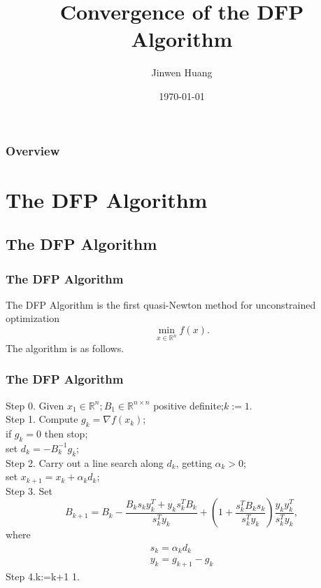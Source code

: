 \documentclass{beamer}
\title[Short title]{Convergence of the DFP Algorithm} %
\author{Jinwen Huang} %
\institute[sysu] %
{
Sun Yat-sen University \\ %
\medskip
\textit{huangjw267@mail2.sysu.edu.cn} %
}
\date{\today} %
\begin{document}
\begin{frame}
\titlepage %
\end{frame}

\begin{frame}
\frametitle{Overview} %
\tableofcontents %
\end{frame}


\section{The DFP Algorithm} 
\subsection{The DFP Algorithm}
\begin{frame}
\frametitle{The DFP Algorithm}
    The DFP Algorithm is the first quasi-Newton method for unconstrained optimization \[\min _{x \in \mathbb{R}^{n}} f(x) . \tag{1.1}\]
    The algorithm is as follows.
\end{frame}

\begin{frame}
\frametitle{The DFP Algorithm}
Step 0. Given $x_1 \in \mathbb{R}^n ; B_1 \in \mathbb{R}^{n \times n}$ positive definite;$k:=1.$\\
Step 1. Compute $g_k=\nabla f\left(x_k\right)$;\\
if $g_k=0$ then stop;\\
set $d_k=-B_k^{-1} g_k$;\\
Step 2. Carry out a line search along $d_k$, getting $\alpha_k>0$;\\
set $x_{k+1}=x_k+\alpha_k d_k$;\\
Step 3. Set\begin{equation*}
    B_{k+1}=B_k-\frac{B_k s_k y_k^T+y_k s_k^T B_k}{s_k^T y_k}+\left(1+\frac{s_k^T B_k s_k}{s_k^T y_k}\right) \frac{y_k y_k^T}{s_k^T y_k}, \tag{1.2}
\end{equation*}
where\begin{align*}
    s_k=\alpha_k d_k \tag{1.3}\\
    y_k=g_{k+1}-g_k  \tag{1.4}
\end{align*}
Step 4.k:=k+1  1.

\end{frame}
\end{document}
